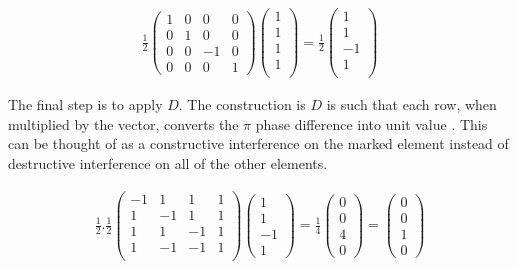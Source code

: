 \begin{align}
        \frac{1}{2}
        \begin{pmatrix}
        1 & 0 & 0 & 0 \\
        0 & 1 & 0 & 0\\
        0  & 0 & -1 & 0 \\
        0 & 0 & 0 & 1
        \end{pmatrix}
        \begin{pmatrix}
        1\\
        1\\
        1\\
        1\\
        \end{pmatrix}
        =
        \frac{1}{2}
        \begin{pmatrix}
        1\\
        1\\
        -1\\
        1\\
        \end{pmatrix}
\end{align}

The final step is to apply $D$. The construction is $D$ is such that each row, when multiplied by the vector, converts the $\pi$ phase difference into unit value . This can be thought of as a constructive interference on the marked element instead of destructive interference on all of the other elements. 

\begin{align}
    \frac{1}{2}.\frac{1}{2}
    \begin{pmatrix}
    -1 & 1 & 1 & 1\\
    1 & -1 & 1 & 1 \\
    1 & 1 & -1 & 1 \\
    1 & -1 & -1 & 1 \\
    \end{pmatrix}
    \begin{pmatrix}
    1 \\ 1 \\ -1 \\ 1 
    \end{pmatrix}
    =
    \frac{1}{4}
    \begin{pmatrix}
    0 \\ 0 \\ 4 \\ 0
    \end{pmatrix}
    = 
    \begin{pmatrix}
    0 \\ 0 \\ 1 \\ 0
    \end{pmatrix}
\end{align}

